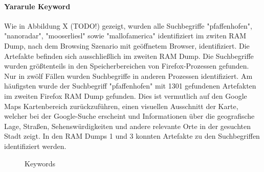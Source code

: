 \paragraph*{Yararule Keyword}
Wie in Abbildung X (TODO!) gezeigt, wurden alle Suchbegriffe "pfaffenhofen", "nanoradar", "mooserliesl" sowie "mallofamerica" identifiziert im zwiten RAM Dump, nach dem Browsing Szenario mit geöffnetem Browser, identifiziert. Die Artefakte befinden sich ausschließlich im zweiten RAM Dump. Die Suchbegriffe wurden größtenteils in den Speicherbereichen von Firefox-Prozessen gefunden. Nur in zwölf Fällen wurden Suchbegriffe in anderen Prozessen identifiziert. Am häufigsten wurde der Suchbegriff "pfaffenhofen" mit 1301 gefundenen Artefakten im zweiten Firefox RAM Dump gefunden. Dies ist vermutlich auf den Google Maps Kartenbereich zurückzuführen, einen visuellen Ausschnitt der Karte, welcher bei der Google-Suche erscheint und Informationen über die geografische Lage, Straßen, Sehenswürdigkeiten und andere relevante Orte in der gesuchten Stadt zeigt. In den RAM Dumps 1 und 3 konnten Artefakte zu den Suchbegriffen identifiziert werden.
\begin{figure}[h!]
	\centerline{}
	\label{chart:final-criteria}  
	\caption{Keywords}
\end{figure}

